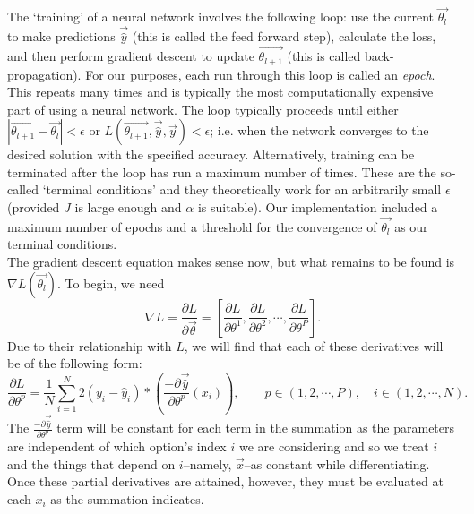\documentclass[reqno,14pt]{amsart}
\theoremstyle{plain}
\theoremstyle{definition}
\theoremstyle{remark}
\begin{document}
The `training' of a neural network involves the following loop: use the current $\overrightarrow{\theta_{l}}$ to make predictions $\overrightarrow{\hat{y}}$ (this is called the feed forward step), calculate the loss, and then perform gradient descent to update $\overrightarrow{\theta_{l+1}}$ (this is called back-propagation). For our purposes, each run through this loop is called an \textit{epoch}. This repeats many times and is typically the most computationally expensive part of using a neural network. The loop typically proceeds until either $| \overrightarrow{\theta_{l+1}} - \overrightarrow{\theta_{l}} | < \epsilon$ or $L(\overrightarrow{\theta_{l+1}}, \overrightarrow{\hat{y}}, \overrightarrow{y}) < \epsilon$; i.e. when the network converges to the desired solution with the specified accuracy. Alternatively, training can be terminated after the loop has run a maximum number of times. These are the so-called `terminal conditions' and they theoretically work for an arbitrarily small $\epsilon$ (provided $J$ is large enough and $\alpha$ is suitable). Our implementation included a maximum number of epochs and a threshold for the convergence of $\overrightarrow{\theta_l}$ as our terminal conditions.\\

The gradient descent equation makes sense now, but what remains to be found is $\nabla L(\overrightarrow{\theta_{l}})$. To begin, we need
\begin{equation}
    \nabla L = \frac{\partial L}{\partial \overrightarrow{\theta}} = \left[ \frac{\partial L}{\partial \theta^1}, \frac{\partial L}{\partial \theta^2}, \cdots, \frac{\partial L}{\partial \theta^P} \right].
\end{equation}
Due to their relationship with $L$, we will find that each of these derivatives will be of the following form:
\begin{equation}
    \frac{\partial L}{\partial \theta^p} = \frac{1}{N} \sum^N_{i=1} 2 (y_i - \hat{y}_i ) * (\frac{- \partial \overrightarrow{\hat{y}} }{\partial \theta^p} (x_i)), \qquad p \in (1, 2, \cdots, P), \quad i \in (1, 2, \cdots, N).
\end{equation}
The $\frac{- \partial \overrightarrow{\hat{y}} }{\partial \theta^p}$ term will be constant for each term in the summation as the parameters are independent of which option's index $i$ we are considering and so we treat $i$ and the things that depend on $i$--namely, $\overrightarrow{x}$--as constant while differentiating. Once these partial derivatives are attained, however, they must be evaluated at each $x_i$ as the summation indicates.\\
\end{document}
